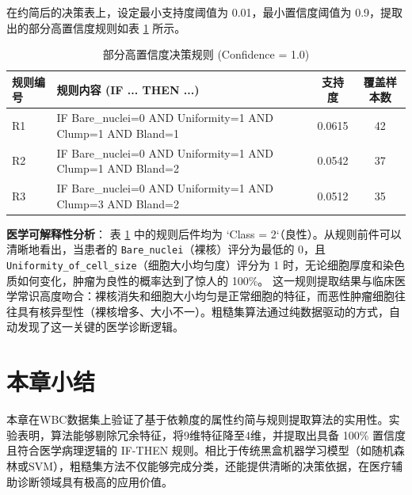 在约简后的决策表上，设定最小支持度阈值为 0.01，最小置信度阈值为 0.9，提取出的部分高置信度规则如表 \ref{tab:rules} 所示。

\begin{table}[htbp]
	\centering
	\caption{部分高置信度决策规则 (Confidence = 1.0)}
	\label{tab:rules}
	\begin{tabular}{llcc}
		\hline
		\textbf{规则编号} & \textbf{规则内容 (IF ... THEN ...)} & \textbf{支持度} & \textbf{覆盖样本数} \\
		\hline
		R1 & IF Bare\_nuclei=0 AND Uniformity=1 AND Clump=1 AND Bland=1 & 0.0615 & 42 \\
		R2 & IF Bare\_nuclei=0 AND Uniformity=1 AND Clump=1 AND Bland=2 & 0.0542 & 37 \\
		R3 & IF Bare\_nuclei=0 AND Uniformity=1 AND Clump=3 AND Bland=2 & 0.0512 & 35 \\
		\hline
	\end{tabular}
\end{table}

\textbf{医学可解释性分析}：
表 \ref{tab:rules} 中的规则后件均为 `Class = 2`（良性）。从规则前件可以清晰地看出，当患者的 \texttt{Bare\_nuclei}（裸核）评分为最低的 0，且 \texttt{Uniformity\_of\_cell\_size}（细胞大小均匀度）评分为 1 时，无论细胞厚度和染色质如何变化，肿瘤为良性的概率达到了惊人的 100\%。
这一规则提取结果与临床医学常识高度吻合：裸核消失和细胞大小均匀是正常细胞的特征，而恶性肿瘤细胞往往具有核异型性（裸核增多、大小不一）。粗糙集算法通过纯数据驱动的方式，自动发现了这一关键的医学诊断逻辑。

\section{本章小结}

本章在WBC数据集上验证了基于依赖度的属性约简与规则提取算法的实用性。实验表明，算法能够剔除冗余特征，将9维特征降至4维，并提取出具备 100\% 置信度且符合医学病理逻辑的 IF-THEN 规则。相比于传统黑盒机器学习模型（如随机森林或SVM），粗糙集方法不仅能够完成分类，还能提供清晰的决策依据，在医疗辅助诊断领域具有极高的应用价值。